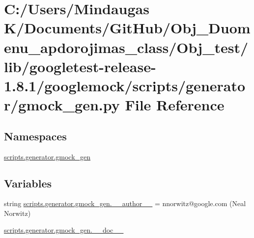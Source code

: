 \hypertarget{_obj__test_2lib_2googletest-release-1_88_81_2googlemock_2scripts_2generator_2gmock__gen_8py}{}\section{C\+:/\+Users/\+Mindaugas K/\+Documents/\+Git\+Hub/\+Obj\+\_\+\+Duomenu\+\_\+apdorojimas\+\_\+class/\+Obj\+\_\+test/lib/googletest-\/release-\/1.8.1/googlemock/scripts/generator/gmock\+\_\+gen.py File Reference}
\label{_obj__test_2lib_2googletest-release-1_88_81_2googlemock_2scripts_2generator_2gmock__gen_8py}
\subsection*{Namespaces}
\begin{DoxyCompactItemize}
\item 
 \mbox{\hyperlink{namespacescripts_1_1generator_1_1gmock__gen}{scripts.\+generator.\+gmock\+\_\+gen}}
\end{DoxyCompactItemize}
\subsection*{Variables}
\begin{DoxyCompactItemize}
\item 
string \mbox{\hyperlink{namespacescripts_1_1generator_1_1gmock__gen_afcc789770dfc60c0f50a88f38d914870}{scripts.\+generator.\+gmock\+\_\+gen.\+\_\+\+\_\+author\+\_\+\+\_\+}} = \textquotesingle{}nnorwitz@google.\+com (Neal Norwitz)\textquotesingle{}
\item 
\mbox{\hyperlink{namespacescripts_1_1generator_1_1gmock__gen_ab5900c92174bc7217b98374618b7d3dc}{scripts.\+generator.\+gmock\+\_\+gen.\+\_\+\+\_\+doc\+\_\+\+\_\+}}
\end{DoxyCompactItemize}
